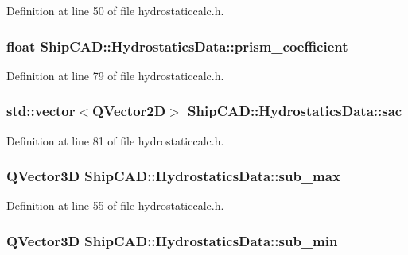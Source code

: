 Definition at line 50 of file hydrostaticcalc.\-h.

\hypertarget{structShipCAD_1_1HydrostaticsData_acabee310fcde293fcb0d9a5fd5effe27}{
\subsubsection[{prism\-\_\-coefficient}]{\setlength{\rightskip}{0pt plus 5cm}float Ship\-C\-A\-D\-::\-Hydrostatics\-Data\-::prism\-\_\-coefficient}}\label{structShipCAD_1_1HydrostaticsData_acabee310fcde293fcb0d9a5fd5effe27}


Definition at line 79 of file hydrostaticcalc.\-h.

\hypertarget{structShipCAD_1_1HydrostaticsData_a503a1f2299db9d5ae923e598b8ee31ba}{
\subsubsection[{sac}]{\setlength{\rightskip}{0pt plus 5cm}std\-::vector$<$Q\-Vector2\-D$>$ Ship\-C\-A\-D\-::\-Hydrostatics\-Data\-::sac}}\label{structShipCAD_1_1HydrostaticsData_a503a1f2299db9d5ae923e598b8ee31ba}


Definition at line 81 of file hydrostaticcalc.\-h.

\hypertarget{structShipCAD_1_1HydrostaticsData_ab3a6e316a991426c74673025439f123c}{
\subsubsection[{sub\-\_\-max}]{\setlength{\rightskip}{0pt plus 5cm}Q\-Vector3\-D Ship\-C\-A\-D\-::\-Hydrostatics\-Data\-::sub\-\_\-max}}\label{structShipCAD_1_1HydrostaticsData_ab3a6e316a991426c74673025439f123c}


Definition at line 55 of file hydrostaticcalc.\-h.

\hypertarget{structShipCAD_1_1HydrostaticsData_a2d0a1e5f6bf98f8eceb958e5f7e7c73e}{
\subsubsection[{sub\-\_\-min}]{\setlength{\rightskip}{0pt plus 5cm}Q\-Vector3\-D Ship\-C\-A\-D\-::\-Hydrostatics\-Data\-::sub\-\_\-min}}\label{structShipCAD_1_1HydrostaticsData_a2d0a1e5f6bf98f8eceb958e5f7e7c73e}


